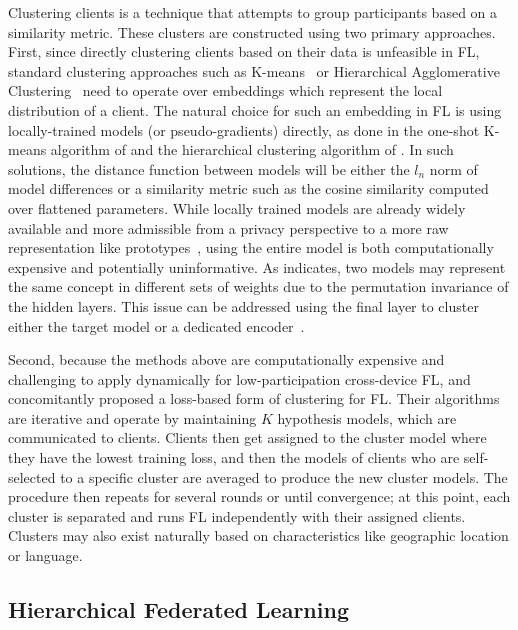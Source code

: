 Clustering clients is a technique that attempts to group participants based on a similarity metric. These clusters are constructed using two primary approaches. First, since directly clustering clients based on their data is unfeasible in FL, standard clustering approaches such as K-means~\citep{K-means} or Hierarchical Agglomerative Clustering~\citep{OgHierClustering} need to operate over embeddings which represent the local distribution of a client. The natural choice for such an embedding in FL is using locally-trained models (or pseudo-gradients) directly, as done in the one-shot K-means algorithm of \citet{AnEfficientFrameworkForClusteredFL} and the hierarchical clustering algorithm of \citet{HierClustering}. In such solutions, the distance function between models will be either the $l_n$ norm of model differences or a similarity metric such as the cosine similarity computed over flattened parameters. While locally trained models are already widely available and more admissible from a privacy perspective to a more raw representation like prototypes~\citep{FedProto}, using the entire model is both computationally expensive and potentially uninformative. As \citet{FedMA} indicates, two models may represent the same concept in different sets of weights due to the permutation invariance of the hidden layers. This issue can be addressed using the final layer to cluster either the target model or a dedicated encoder~\citep{CommunityBasedFL}.

Second, because the methods above are computationally expensive and challenging to apply dynamically for low-participation cross-device FL, \citet{AnEfficientFrameworkForClusteredFL} and \citet{ThreeApproachesMansour} concomitantly proposed a loss-based form of clustering for FL. Their algorithms are iterative and operate by maintaining $K$ hypothesis models, which are communicated to clients. Clients then get assigned to the cluster model where they have the lowest training loss, and then the models of clients who are self-selected to a specific cluster are averaged to produce the new cluster models. The procedure then repeats for several rounds or until convergence; at this point, each cluster is separated and runs FL independently with their assigned clients. Clusters may also exist naturally based on characteristics like geographic location or language.





\subsection{Hierarchical Federated Learning}\label{sec:back:HFL}


